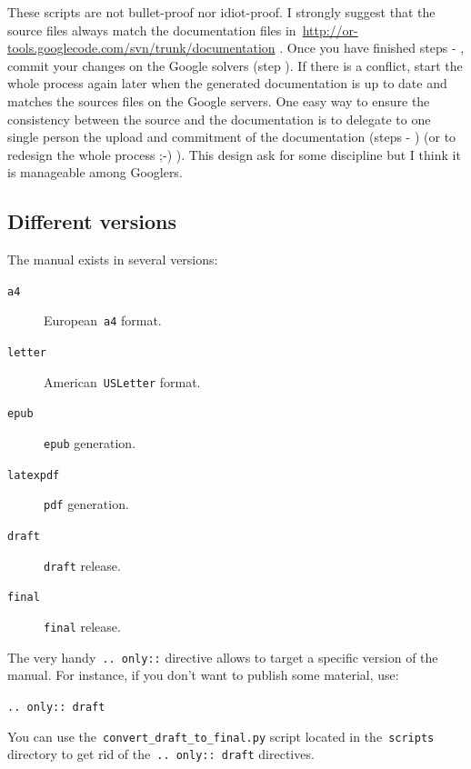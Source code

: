 \documentclass[a4paper,10pt]{article}
\newcommand{\code}[1]{\texttt{#1}}
\begin{document}
These scripts are not bullet-proof nor idiot-proof. I strongly suggest that the source files always match the documentation files in~\href{http://or-tools.googlecode.com/svn/trunk/documentation}{http://or-tools.googlecode.com/svn/trunk/documentation} . Once you have finished steps  - , commit your changes on the Google solvers (step ). If there is a conflict, start the whole process again later when the generated documentation is up to date and matches the sources files on the Google servers. One easy way to ensure the consistency between the source and the documentation is to delegate to one single person the upload and commitment of the documentation (steps  - ) (or to redesign the whole process ;-) ). This design ask for some discipline but I think it is manageable among Googlers.





\subsection{Different versions}
\label{manual_different_version}

The manual exists in several versions:

\begin{description}
\item[\code{a4}] European~\code{a4} format.
\item[\code{letter}] American~\code{USLetter} format.
\item[\code{epub}] \code{epub} generation.
\item[\code{latexpdf}] \code{pdf} generation.
\item[\code{draft}] \code{draft} release.
\item[\code{final}]  \code{final} release.
\end{description}

The very handy~\code{..  only::} directive allows to target a specific version of the manual. For instance, if you don't want
to publish some material, use:
\begin{center}
\code{..	only:: draft}
\end{center}

You can use the~\code{convert\_draft\_to\_final.py} script located in the~\code{scripts} directory to get rid of the~\code{..	only:: draft} directives.
\end{document}
